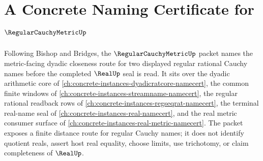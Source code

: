 \chapter{A Concrete Naming Certificate for $\RegularCauchyMetricUp$}
\label{ch:concrete-instances-regularcauchymetric-namecert}

Following Bishop and Bridges, the $\RegularCauchyMetricUp$ packet names the metric-facing dyadic closeness route for two displayed regular rational Cauchy names before the completed $\RealUp$ seal is read. It sits over the dyadic arithmetic core of \autoref{ch:concrete-instances-dyadicratcore-namecert}, the common finite windows of \autoref{ch:concrete-instances-streamname-namecert}, the regular rational readback rows of \autoref{ch:concrete-instances-regseqrat-namecert}, the terminal real-name seal of \autoref{ch:concrete-instances-real-namecert}, and the real metric consumer surface of \autoref{ch:concrete-instances-real-metric-namecert}. The packet exposes a finite distance route for regular Cauchy names; it does not identify quotient reals, assert host real equality, choose limits, use trichotomy, or claim completeness of $\RealUp$.


